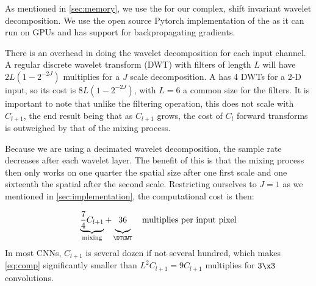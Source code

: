 As mentioned in \autoref{sec:memory}, we use the \DTCWT for our complex, shift
invariant wavelet decomposition. We use the open source Pytorch implementation
of the \DTCWT \cite{cotter_pytorch_2018} as it can run on GPUs and
has support for backpropagating gradients.

There is an overhead in doing the wavelet decomposition for each input channel. A
regular discrete wavelet transform (DWT) with filters of length $L$ will have
$2L\left(1-2^{-2J}\right)$ multiplies for a $J$ scale decomposition. A \DTCWT
has 4 DWTs for a 2-D input, so its cost is $8L\left(1-2^{-2J}\right)$, with
$L=6$ a common size for the filters. It is important to note that unlike the
filtering operation, this does not scale with $C_{l+1}$, the end result being that as
$C_{l+1}$ grows, the cost of $C_l$ forward transforms is outweighed by that of the mixing
process.

Because we are using a decimated wavelet decomposition, the sample rate decreases after each
wavelet layer. The benefit of this is that the mixing process then only works on
one quarter the spatial size after one first scale and one sixteenth the spatial
after the second scale. Restricting ourselves to $J=1$ as we mentioned in
\autoref{sec:implementation}, the computational cost is then:

\begin{equation}
  \underbrace{ \frac{7}{4}C_{l+1} }_{\textrm{mixing}} +
  \underbrace{\vphantom{\frac{7}{4}} 36}_{\textrm{\DTCWT}} \quad
  \textrm{multiplies per input pixel}\label{eq:comp}
\end{equation}
In most CNNs, $C_{l+1}$ is several dozen if not several
hundred, which makes \autoref{eq:comp} significantly smaller than
$L^2C_{l+1}=9C_{l+1}$ multiplies for $3\x 3$ convolutions.


